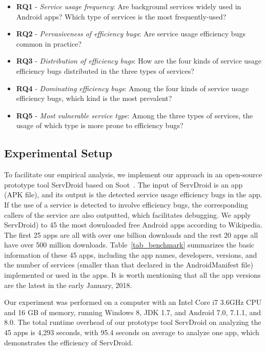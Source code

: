 \documentclass[sigconf,review, anonymous]{acmart}
\begin{document}
\begin{itemize}
\item {\bf RQ1} - {\it Service usage frequency}: Are background services widely used in Android apps? Which type of services is the most frequently-used?
\item {\bf RQ2} - {\it Pervasiveness of efficiency bugs}: Are service usage efficiency bugs common in practice?
\item {\bf RQ3} - {\it Distribution of efficiency bugs}: How are the four kinds of service usage efficiency bugs distributed in the three types of services?
\item {\bf RQ4} - {\it Dominating efficiency bugs}: Among the four kinds of service usage efficiency bugs, which kind is the most prevalent?
\item {\bf RQ5} - {\it Most vulnerable service type}: Among the three types of services, the usage of which type is more prone to efficiency bugs?
\end{itemize}

\subsection{Experimental Setup}

To facilitate our empirical analysis, we implement our approach in an open-source prototype tool {\sf ServDroid} based on {\sf Soot}~\cite{sootpaper}. The input of {\sf ServDroid} is an app (APK file), and its output is the detected service usage efficiency bugs in the app. If the use of a service is detected to involve efficiency bugs, the corresponding callers of the service are also outputted, which facilitates debugging. We apply {\sf ServDroid}) to 45 the most downloaded free Android apps according to Wikipedia. The first 25 apps are all with over one billion downloads and the rest 20 apps all have over 500 million downloads. Table~\ref{tab_benchmark} summarizes the basic information of these 45 apps, including the app names, developers, versions, and the number of services (smaller than that declared in the AndroidManifest file) implemented or used in the apps. It is worth mentioning that all the app versions are the latest in the early January, 2018.

Our experiment was performed on a computer with an Intel Core i7 3.6GHz CPU and 16 GB of memory, running Windows 8, JDK 1.7, and Android 7.0, 7.1.1, and 8.0.  The total runtime overhead of our prototype tool {\sf ServDroid} on analyzing the 45 apps is 4,293 seconds, with 95.4 seconds on average to analyze one app, which demonstrates the efficiency of {\sf ServDroid}.
\end{document}
